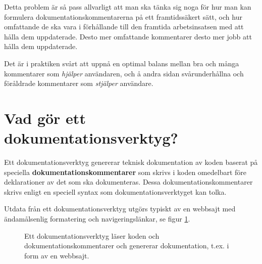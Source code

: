 Detta problem är så pass allvarligt att man ska tänka sig noga för hur man kan formulera  dokumentationskommentarerna på ett framtidssäkert sätt, och hur omfattande de ska vara i förhållande till den framtida arbetsinsatsen med att hålla dem uppdaterade. Desto mer omfattande kommentarer desto mer jobb att hålla dem uppdaterade. 

Det är i praktiken svårt att uppnå en optimal balans mellan bra och många kommentarer som \textit{hjälper} användaren, och å andra sidan svårunderhållna och föråldrade kommentarer som \textit{stjälper} användare.


\section{Vad gör ett dokumentationsverktyg?}\label{appendix:buildtool}

Ett dokumentationsverktyg genererar teknisk dokumentation av koden baserat på speciella \textbf{dokumentationskommentarer} som skrivs i koden omedelbart före deklarationer av det som ska dokumenteras. Dessa dokumentationskommentarer skrivs enligt en speciell syntax som dokumentationsverktyget kan tolka.

Utdata från ett dokumentationsverktyg utgörs typiskt av en webbsajt med ändamålsenlig formatering och navigeringslänkar, se figur \ref{fig:appendix:doctool}.

\begin{figure}[H]
\centering
{}
    \caption{Ett dokumentationsverktyg läser koden och dokumentationskommentarer och genererar dokumentation, t.ex. i form av en webbsajt.}
    \label{fig:appendix:doctool}
\end{figure}



